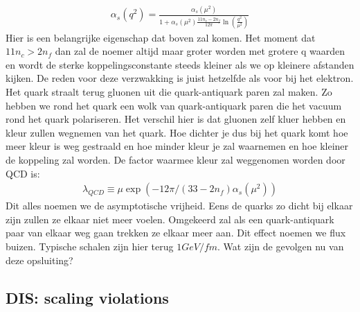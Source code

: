 \documentclass[../main.tex]{subfiles}
\begin{document}
\begin{equation}
    \begin{aligned}
        \label{eq:running_strong}
        \alpha_s(q^2) = \frac{\alpha_s(\mu^2)}{1+\alpha_s(\mu^2) \frac{11n_c-2n_f}{12\pi} \ln\left(\frac{q^2}{\mu^2}\right)} 
    \end{aligned}
\end{equation}
 Hier is een belangrijke eigenschap dat boven zal komen. Het moment dat $11n_c>2n_f$ dan zal de noemer altijd maar groter worden met grotere q waarden en wordt de sterke koppelingsconstante steeds kleiner als we op kleinere afstanden kijken. De reden voor deze verzwakking is juist hetzelfde als voor bij het elektron. Het quark straalt terug gluonen uit die quark-antiquark paren zal maken. Zo hebben we rond het quark een wolk van quark-antiquark paren die het vacuum rond het quark polariseren. Het verschil hier is dat gluonen zelf kluer hebben en kleur zullen wegnemen van het quark. Hoe dichter je dus bij het quark komt hoe meer kleur is weg gestraald en hoe minder kleur je zal waarnemen en hoe kleiner de koppeling zal worden. De factor waarmee kleur zal weggenomen worden door QCD is:
\begin{equation}
    \begin{aligned}
        \label{eq:kleur_qcd}
        \lambda_{QCD} \equiv \mu \exp(-12\pi/(33-2n_f)\alpha_s(\mu^2))
    \end{aligned}
\end{equation}
Dit alles noemen we de asymptotische vrijheid. Eens de quarks zo dicht bij elkaar zijn zullen ze elkaar niet meer voelen. Omgekeerd zal als een quark-antiquark paar van elkaar weg gaan trekken ze elkaar meer aan. Dit effect noemen we flux buizen. Typische schalen zijn hier terug $1GeV/fm$. Wat zijn de gevolgen nu van deze opsluiting?

\subsection{DIS: scaling violations}%
\label{sub:dis_scaling_violations}
\end{document}
